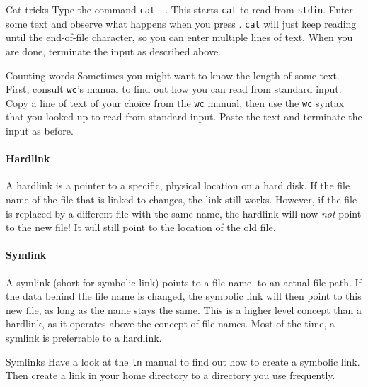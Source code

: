 \documentclass{TheAlternativeCourse}
\begin{document}
\begin{exercisebox}{Cat tricks}
    Type the command \texttt{cat -}. This starts \texttt{cat} to read from
    \texttt{stdin}. Enter some text and observe what happens when you press
    . \texttt{cat} will just keep reading until the end-of-file
    character, so you can enter multiple lines of text. When you are done,
    terminate the input as described above.
\end{exercisebox}

\begin{exercisebox}{Counting words}
    Sometimes you might want to know the length of some text. First, consult
    \texttt{wc}'s manual to find out how you can read from standard input. Copy
    a line of text of your choice from the \texttt{wc} manual, then use the
    \texttt{wc} syntax that you looked up to read from standard input. Paste
    the text and terminate the input as before.
\end{exercisebox}


\paragraph{Hardlink}
A hardlink is a pointer to a specific, physical location on a hard disk. If the
file name of the file that is linked to changes, the link still works. However,
if the file is replaced by a different file with the same name, the hardlink
will now \emph{not} point to the new file!  It will still point to the location
of the old file.

\paragraph{Symlink}
A symlink (short for symbolic link) points to a file name, to an actual file
path. If the data behind the file name is changed, the symbolic link will then
point to this new file, as long as the name stays the same. This is a higher
level concept than a hardlink, as it operates above the concept of file names.
Most of the time, a symlink is preferrable to a hardlink.

\begin{exercisebox}{Symlinks}
    Have a look at the \texttt{ln} manual to find out how to create a symbolic
    link. Then create a link in your home directory to a directory you use
    frequently.
\end{exercisebox}
\end{document}
